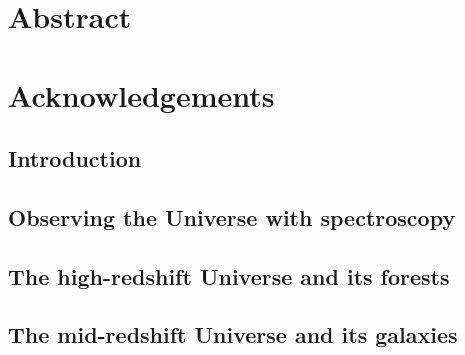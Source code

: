 \documentclass[a4paper, 11pt, twoside]{book}
\begin{document}
	\frontmatter
	\thispagestyle{empty}
	
	

	\thispagestyle{empty}
	

	\chapter*{Abstract}					
	

	\chapter*{Acknowledgements}			
	


    \tableofcontents					%
    
	

	\mainmatter 

	\begin{refsection}
		\chapter{Introduction}
		\label{chap:intro}
		
		\printbibliography[heading=subbibintoc]
	\end{refsection}

	\begin{refsection}
		\chapter{Observing the Universe with spectroscopy}
		\label{chap:spectro}
		
		\printbibliography[heading=subbibintoc]
	\end{refsection}

	\begin{refsection}
		\chapter{The high-redshift Universe and its forests }
		\label{chap:forests}
		
		\printbibliography[heading=subbibintoc]
	\end{refsection}

	\begin{refsection}
		\chapter{The mid-redshift Universe and its galaxies }
		\label{chap:galaxies}
		
		\printbibliography[heading=subbibintoc]
	\end{refsection}
\end{document}
